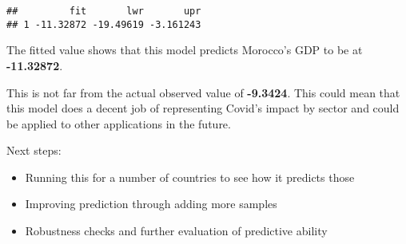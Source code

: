 \documentclass[
]{article}
\providecommand{\tightlist}{%
  \setlength{\itemsep}{0pt}\setlength{\parskip}{0pt}}
\begin{document}
\begin{verbatim}
##         fit       lwr       upr
## 1 -11.32872 -19.49619 -3.161243
\end{verbatim}

The fitted value shows that this model predicts Morocco's GDP to be at
\textbf{-11.32872}.

This is not far from the actual observed value of \textbf{-9.3424}. This
could mean that this model does a decent job of representing Covid's
impact by sector and could be applied to other applications in the
future.

Next steps:

\begin{itemize}
\tightlist
\item
  Running this for a number of countries to see how it predicts those
\item
  Improving prediction through adding more samples
\item
  Robustness checks and further evaluation of predictive ability
\end{itemize}
\end{document}
